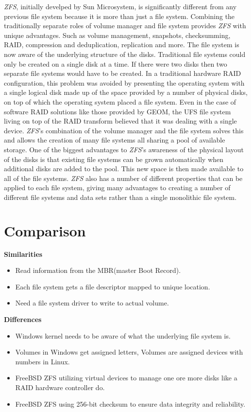 \documentclass[10pt,draftclsnofoot,onecolumn,journal,compsoc]{IEEEtran}
\begin{document}
\textit{ZFS}, initially develped by Sun Microsystem, is significantly different from any previous file system because it is more than just a file system. Combining the traditionally separate roles of volume manager and file system provides \textit{ZFS} with unique advantages. Such as volume management, snapshots, checksumming, RAID, compression and deduplication, replication and more. The file system is now aware of the underlying structure of the disks. Traditional file systems could only be created on a single disk at a time. If there were two disks then two separate file systems would have to be created. In a traditional hardware RAID configuration, this problem was avoided by presenting the operating system with a single logical disk made up of the space provided by a number of physical disks, on top of which the operating system placed a file system. Even in the case of software RAID solutions like those provided by GEOM, the UFS file system living on top of the RAID transform believed that it was dealing with a single device. \textit{ZFS}'s combination of the volume manager and the file system solves this and allows the creation of many file systems all sharing a pool of available storage. One of the biggest advantages to \textit{ZFS}'s awareness of the physical layout of the disks is that existing file systems can be grown automatically when additional disks are added to the pool. This new space is then made available to all of the file systems. \textit{ZFS} also has a number of different properties that can be applied to each file system, giving many advantages to creating a number of different file systems and data sets rather than a single monolithic file system. \cite{BSDhandbook}

\section*{Comparison}
\noindent \textbf{Similarities}\\
\begin{itemize}
    \item Read information from the MBR(master Boot Record).
    \item Each file system gets a file descriptor mapped to unique location.
    \item Need a file system driver to write to actual volume.
\end{itemize}
\noindent \textbf{Differences}\\
\begin{itemize}
    \item Windows kernel needs to be aware of what the underlying file system is.
    \item Volumes in Windows get assigned letters, Volumes are assigned devices with numbers in Linux.
    \item FreeBSD ZFS utilizing virtual devices to manage one ore more disks like a RAID hardware controller do.
    \item FreeBSD ZFS using 256-bit checksum to ensure data integrity and reliability. 
\end{itemize}
\end{document}
